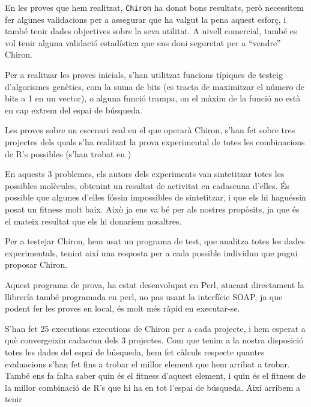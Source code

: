 \documentclass[titlepage,a4paper,12pt]{book}
\begin{document}
	En les proves que hem realitzat, \texttt{Chiron} ha donat bons resultats,
	però necessitem fer algunes validacions per a assegurar que ha valgut la
	pena aquest esforç, i també tenir dades objectives sobre la seva utilitat.
	A nivell comercial, també es vol tenir alguna validació estadística que ens
	doni seguretat per a ``vendre'' Chiron.

	Per a realitzar les proves inicials, s'han utilitzat funcions típiques de
	testeig d'algorismes genètics, com la suma de bits (es tracta de maximitzar
	el número de bits a 1 en un vector), o alguna funció trampa, on el màxim de
	la funció no està en cap extrem del espai de búsqueda.

	Les proves sobre un escenari real en el que operarà Chiron, s'han fet sobre
	tres projectes dels quals s'ha realitzat la prova experimental de totes les
	combinacions de R's possibles (s'han trobat en 
	)

	En aquests 3 problemes, els autors dels experiments van sintetitzar totes
	les possibles molècules, obtenint un resultat de activitat en cadascuna
	d'elles.  És possible que algunes d'elles fóssin impossibles de sintetitzar,
	i que els hi haguéssin posat un fitness molt baix.  Això ja ens va bé per
	als nostres propòsits, ja que és el mateix resultat que els hi donaríem
	nosaltres.

	Per a testejar Chiron, hem usat un programa de test, que analitza totes les
	dades experimentals, tenint així una resposta per a cada possible individuu
	que pugui proposar Chiron.

	Aquest programa de prova, ha estat desenvolupat en Perl, atacant directament
	la llibrería també programada en perl, no pas usant la interfície SOAP, ja
	que podent fer les proves en local, és molt més ràpid en executar-se.

	S'han fet 25 executions executions de Chiron per a cada projecte, i hem
	esperat a què convergeixin cadascun dels 3 projectes.  Com que tenim a la
	nostra disposició totes les dades del espai de búsqueda, hem fet càlculs
	respecte quantes evaluacions s'han fet fins a trobar el millor element que
	hem arribat a trobar.  També ens fa falta saber quin és el fitness d'aquest
	element, i quin és el fitness de la millor combinació de R's que hi ha en
	tot l'espai de búsqueda. Així arribem a tenir


\end{document}
